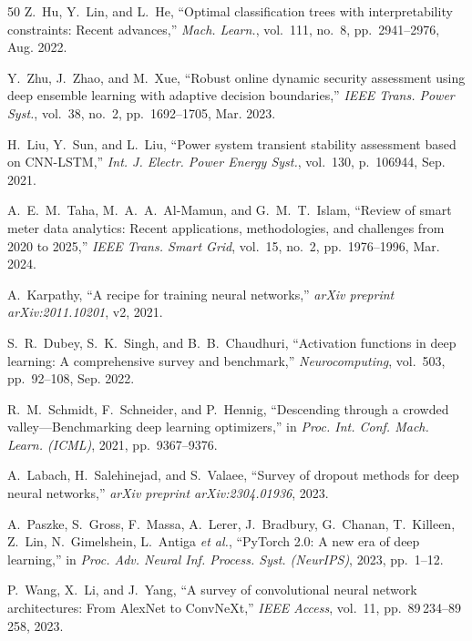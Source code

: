 \documentclass[journal]{IEEEtran}
\begin{document}
\begin{thebibliography}{50}
Z.~Hu, Y.~Lin, and L.~He, ``Optimal classification trees with interpretability constraints: Recent advances,'' \textit{Mach. Learn.}, vol.~111, no.~8, pp.~2941--2976, Aug. 2022.

Y.~Zhu, J.~Zhao, and M.~Xue, ``Robust online dynamic security assessment using deep ensemble learning with adaptive decision boundaries,'' \textit{IEEE Trans. Power Syst.}, vol.~38, no.~2, pp.~1692--1705, Mar. 2023.

H.~Liu, Y.~Sun, and L.~Liu, ``Power system transient stability assessment based on CNN-LSTM,'' \textit{Int. J. Electr. Power Energy Syst.}, vol.~130, p.~106944, Sep. 2021.

A.~E.~M.~Taha, M.~A.~A.~Al-Mamun, and G.~M.~T.~Islam, ``Review of smart meter data analytics: Recent applications, methodologies, and challenges from 2020 to 2025,'' \textit{IEEE Trans. Smart Grid}, vol.~15, no.~2, pp.~1976--1996, Mar. 2024.

A.~Karpathy, ``A recipe for training neural networks,'' \textit{arXiv preprint arXiv:2011.10201}, v2, 2021.

S.~R.~Dubey, S.~K.~Singh, and B.~B.~Chaudhuri, ``Activation functions in deep learning: A comprehensive survey and benchmark,'' \textit{Neurocomputing}, vol.~503, pp.~92--108, Sep. 2022.

R.~M.~Schmidt, F.~Schneider, and P.~Hennig, ``Descending through a crowded valley---Benchmarking deep learning optimizers,'' in \textit{Proc. Int. Conf. Mach. Learn. (ICML)}, 2021, pp.~9367--9376.

A.~Labach, H.~Salehinejad, and S.~Valaee, ``Survey of dropout methods for deep neural networks,'' \textit{arXiv preprint arXiv:2304.01936}, 2023.

A.~Paszke, S.~Gross, F.~Massa, A.~Lerer, J.~Bradbury, G.~Chanan, T.~Killeen, Z.~Lin, N.~Gimelshein, L.~Antiga \emph{et al.}, ``PyTorch 2.0: A new era of deep learning,'' in \textit{Proc. Adv. Neural Inf. Process. Syst. (NeurIPS)}, 2023, pp.~1--12.

P.~Wang, X.~Li, and J.~Yang, ``A survey of convolutional neural network architectures: From AlexNet to ConvNeXt,'' \textit{IEEE Access}, vol.~11, pp.~89\,234--89\,258, 2023.

\end{thebibliography}

\end{document}

